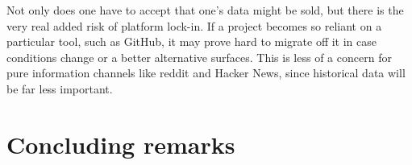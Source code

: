 \documentclass[a4paper,11pt]{article} %
\begin{document}
Not only does one have to accept that one's data might be sold, but
there is the very real added risk of platform lock-in. If a project
becomes so reliant on a particular tool, such as GitHub, it may prove
hard to migrate off it in case conditions change or a better
alternative surfaces. This is less of a concern for pure information
channels like reddit and Hacker News, since historical data will be
far less important.

\section{Concluding remarks}

\newpage
\printbibliography
\end{document}
